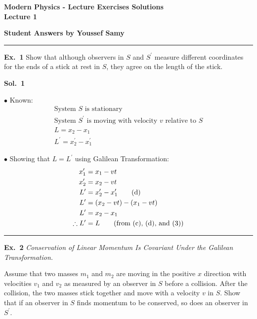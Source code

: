 \documentclass[a4paper,12pt]{article}
\begin{document}
\begin{center}
\textbf{Modern Physics - Lecture Exercises Solutions\\}
\textbf{Lecture 1}


\textbf{Student Answers by Youssef Samy}
\rule{\textwidth}{0.4pt}
\end{center}


\textbf{Ex.~1} Show that although observers in $S$ and $S^{\prime}$ measure different coordinates for the ends of a stick at rest in $S$, they agree on the length of the stick.

\textbf{Sol.~1}

\begin{wrapfigure}[8]{l}{0pt}   
    
\end{wrapfigure}

$\bullet$ Known:
\begin{align}
    \text{System $S$ is stationary} \tag{a}\\
    \text{System $S^\prime$ is moving with velocity $v$ relative to $S$} \tag{b} \\
    L = x_2 - x_1 \tag{c} \\
    L^\prime = x_2^\prime - x_1^\prime \tag{d}
\end{align}

$\bullet$ Showing that $L = L^\prime$ using Galilean Transformation:
\begin{align}
    x_1^\prime &= x_1 - vt \\
    x_2^\prime &= x_2 - vt \\
    L^\prime &= x_2^\prime - x_1^\prime \tag{d} \\
    L^\prime &= (x_2 - vt) - (x_1 - vt) \notag \\
    L^\prime &= x_2 - x_1 \\
    \therefore L^\prime &= L \tag{from (c), (d), and (3)}
\end{align}
\begin{center}
    \rule{6cm}{0.4pt}    
\end{center}

\textbf{Ex.~2} \textit{Conservation of Linear Momentum Is Covariant Under the
Galilean Transformation.}

Assume that two masses $m_1$ and $m_2$ are
moving in the positive $x$ direction with velocities $v_1$ and $v_2$ as
measured by an observer in $S$ before a collision. After the collision,
the two masses stick together and move with a velocity $v$ in $S$.
Show that if an observer in $S$ finds momentum to be conserved, so
does an observer in $S^\prime$.
\end{document}
